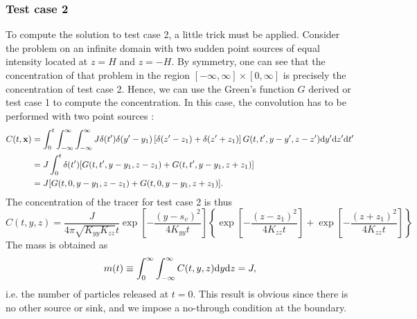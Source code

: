 \subsubsection*{Test case 2}
To compute the solution to test case 2, a little trick must be applied. Consider the problem on an infinite domain with two sudden point sources of equal intensity located at $z = H$ and $z = -H$. By symmetry, one can see that the concentration of that problem in the region $[-\infty, \infty] \times [0, \infty]$ is precisely the concentration of test case 2. Hence, we can use the Green's function $G$ derived or test case 1 to compute the concentration. In this case, the convolution has to be performed with two point sources :
\begin{align}
	C(t,\b x) &= \int_{0}^{t} \int_{-\infty}^{\infty} \int_{-\infty}^{\infty} J \delta(t') \delta(y'- y_1)\left[\delta(z'-z_1)+\delta(z'+z_1)\right] G(t,t',y-y',z-z') \rm dy' \rm dz' \rm dt' \nonumber\\
	&= J \int_{0}^{t} \delta(t')[G(t,t',y-y_1,z-z_1)+G(t,t',y-y_1,z+z_1)] \label{tc2_eq2} \nonumber\\
	&= J[G(t,0,y-y_1,z-z_1)+G(t,0,y-y_1,z+z_1)].
\end{align}
The concentration of the tracer for test case 2 is thus
\begin{equation}
	C(t,y,z) = \frac{J}{4\pi\sqrt{K_{yy}K_{zz}}t}\exp\left[-\frac{(y-s_v)^2}{4K_{yy}t}\right]\left\{\exp\left[-\frac{(z-z_1)^2}{4K_{zz}t} \right] + \exp\left[-\frac{(z+z_1)^2}{4K_{zz}t} \right] \right\}
\end{equation}
The mass is obtained as
\begin{equation}
	m(t) \equiv \int_{0}^{\infty} \int_{-\infty}^{\infty} C(t,y,z) \rm dy \rm dz = J,
\end{equation}
i.e. the number of particles released at $t=0$. This result is obvious since there is no other source or sink, and we impose a no-through condition at the boundary.

